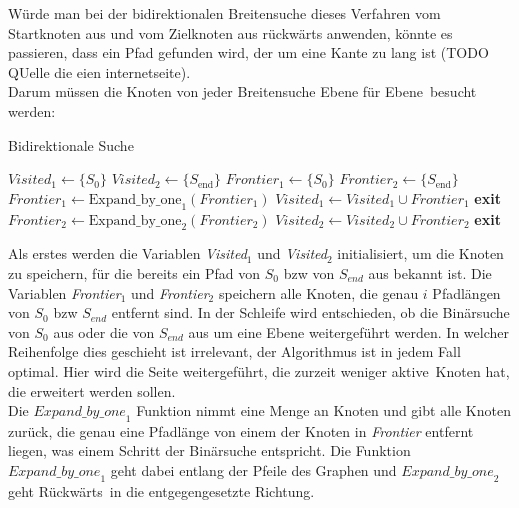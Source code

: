 \documentclass[a4paper,10pt,ngerman]{scrartcl}
\begin{document}
    Würde man bei der bidirektionalen Breitensuche dieses Verfahren vom Startknoten aus und vom Zielknoten aus rückwärts anwenden, könnte es passieren, dass ein Pfad gefunden wird, der um eine Kante zu lang ist (TODO QUelle die eien internetseite). \\
    Darum müssen die Knoten von jeder Breitensuche \glqq Ebene für Ebene\grqq~besucht werden:
    \begin{algorithm}[H]
        \caption{Bidirektionale Suche}
        \label{alg:bidirectional-search}
        \begin{algorithmic}[1]
            \State $Visited_{1} \gets \{S_{0}\}$
            \State $Visited_{2} \gets \{S_{\text{end}}\}$
            \State $Frontier_{1} \gets \{S_{0}\}$
            \State $Frontier_{2} \gets \{S_{\text{end}}\}$
                    \State $Frontier_{1} \gets \text{Expand\_by\_one}_1(Frontier_{1})$
                    \State $Visited_{1} \gets Visited_{1} \cup Frontier_{1}$
                        \State \textbf{exit} 
                    \EndIf
                \Else
                    \State $Frontier_{2} \gets \text{Expand\_by\_one}_2(Frontier_{2})$
                    \State $Visited_{2} \gets Visited_{2} \cup Frontier_{2}$
                        \State \textbf{exit} 
                    \EndIf
                \EndIf
            \EndWhile
        \end{algorithmic}
    \end{algorithm}
    Als erstes werden die Variablen \textit{Visited$_1$} und \textit{Visited$_2$} initialisiert, um die Knoten zu speichern, für die bereits ein Pfad von $S_0$ bzw von $S_{end}$ aus bekannt ist. Die Variablen \textit{Frontier$_1$} und \textit{Frontier$_2$} speichern alle Knoten, die genau $i$ Pfadlängen von $S_0$ bzw $S_{end}$ entfernt sind. In der Schleife wird entschieden, ob die Binärsuche von $S_0$ aus oder die von $S_{end}$ aus um eine Ebene weitergeführt werden. In welcher Reihenfolge dies geschieht ist irrelevant, der Algorithmus ist in jedem Fall optimal. Hier wird die Seite weitergeführt, die zurzeit weniger \glqq aktive\grqq~Knoten hat, die erweitert werden sollen.\\
    Die $\textit{Expand\_by\_one}_1$ Funktion nimmt eine Menge an Knoten und gibt alle Knoten zurück, die genau eine Pfadlänge von einem der Knoten in \textit{Frontier} entfernt liegen, was einem Schritt der Binärsuche entspricht. Die Funktion $\textit{Expand\_by\_one}_1$ geht dabei entlang der Pfeile des Graphen und $\textit{Expand\_by\_one}_2$ geht \glqq Rückwärts\grqq~in die entgegengesetzte Richtung. \\
\end{document}
